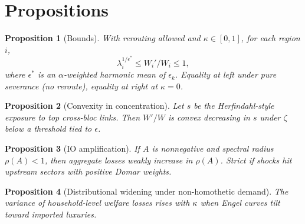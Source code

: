 \documentclass{article}
\begin{document}
\section*{Propositions}

\newtheorem{proposition}{Proposition}

\begin{proposition}[Bounds]
With rerouting allowed and $\kappa \in [0,1]$, for each region $i$,
$$
   \lambda_i^{1/\epsilon^\ast} \le W_i'/W_i \le 1,
$$
where $\epsilon^\ast$ is an $\alpha$-weighted harmonic mean of $\epsilon_k$. Equality at left under pure severance (no reroute), equality at right at $\kappa=0$.
\end{proposition}

\begin{proposition}[Convexity in concentration]
Let $s$ be the Herfindahl-style exposure to top cross-bloc links. Then $W'/W$ is convex decreasing in $s$ under $\zeta$ below a threshold tied to $\epsilon$.
\end{proposition}

\begin{proposition}[IO amplification]
If $A$ is nonnegative and spectral radius $\rho(A) < 1$, then aggregate losses weakly increase in $\rho(A)$. Strict if shocks hit upstream sectors with positive Domar weights.
\end{proposition}

\begin{proposition}[Distributional widening under non-homothetic demand]
The variance of household-level welfare losses rises with $\kappa$ when Engel curves tilt toward imported luxuries.
\end{proposition}
\end{document}
